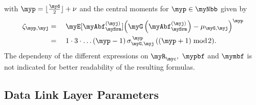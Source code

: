 \newpage
\begin{minipage}[t][12cm]{\columnwidth}

with $\myp = \lfloor \frac{\myd}{2} \rfloor +\nu$ and the central moments for $\myp \in \myNbb$ given by
\begin{align*}
\zeta_{\myp,\myj}
&=
\quad\myE[\myAbf^{(\myj)}_{\mySrm}]
{
    \left(
        \myG\left( \myAbf^{(\myj)}_{\mySrm} \right)
        - \mu_{\myG,\myj}
    \right)^{\myp}
}
\\
&=\quad
1 \cdot 3 \cdot \ldots (\myp-1)\,
\sigma_{\myG,\myj}^{\,\myp}\,
( (\myp+1)\bmod\!2 ).
\end{align*}
The dependeny of the different expressions on $\myR_\myc,$ $\mypbf$ and $\mymbf$ \!is not indicated for better readability of the resulting formulas.
\vspace{-1em}
\subsection{Data Link Layer Parameters}
\label{sec:3b}


\end{minipage}
